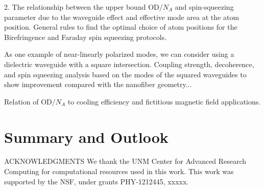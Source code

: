 \documentclass[preprint,aps,pra,onecolumn,superscriptaddress]{revtex4-1} %
\begin{document}
2. The relationship between the upper bound OD$ /N_A $ and spin-squeezing parameter due to the waveguide effect and effective mode area at the atom position. 
General rules to find the optimal choice of atom positions for the Birefringence and Faraday spin squeezing protocols.


As one example of near-linearly polarized modes, we can consider using a dielectric waveguide with a square intersection. 
Coupling strength, decoherence, and spin squeezing analysis based on the modes of the squared waveguides to show improvement compared with the nanofiber geometry...

Relation of OD$ /N_A $ to cooling efficiency and fictitious magnetic field applications.

\section{Summary and Outlook} \label{Sec::Conclusion}


ACKNOWLEDGMENTS
We thank the UNM Center for Advanced Research Computing for computational resources used in this work.
This work was supported by the NSF, under grants PHY-1212445, xxxxx.


\end{document}
